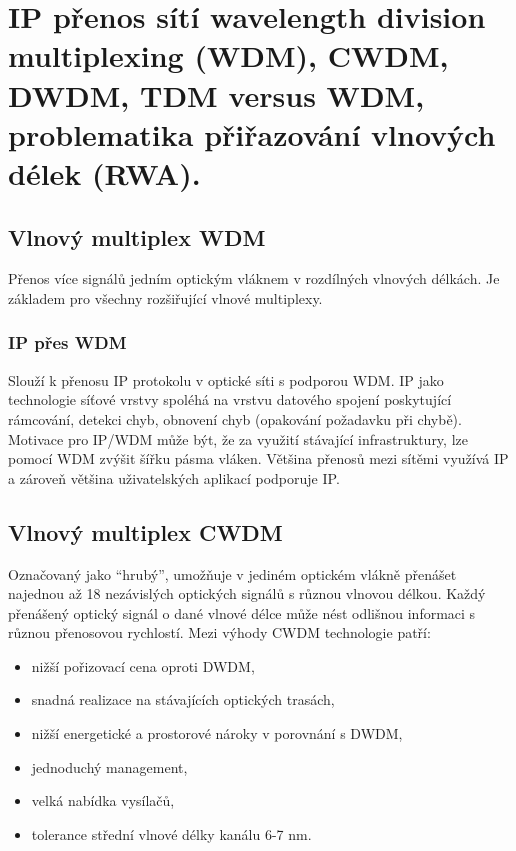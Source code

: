 \clearpage
\section{IP přenos sítí wavelength division multiplexing (WDM), CWDM, DWDM, TDM versus WDM, problematika přiřazování vlnových délek (RWA).}

\subsection{Vlnový multiplex WDM}

Přenos více signálů jedním optickým vláknem v rozdílných vlnových délkách. Je základem pro všechny rozšiřující vlnové multiplexy.

\subsubsection{IP přes WDM}

Slouží k přenosu IP protokolu v optické síti s podporou WDM. IP jako technologie síťové vrstvy spoléhá na vrstvu datového spojení poskytující rámcování, detekci chyb, obnovení chyb (opakování požadavku při chybě). Motivace pro IP/WDM může být, že za využití stávající infrastruktury, lze pomocí WDM zvýšit šířku pásma vláken. Většina přenosů mezi sítěmi využívá IP a zároveň většina uživatelských aplikací podporuje IP.

\subsection{Vlnový multiplex CWDM }
Označovaný jako \enquote{hrubý}, umožňuje v jediném optickém vlákně přenášet najednou až 18 nezávislých optických signálů s různou vlnovou délkou. Každý přenášený optický signál o dané vlnové délce může nést odlišnou informaci s různou přenosovou rychlostí.
Mezi výhody CWDM technologie patří:
\begin{itemize}
    \item nižší pořizovací cena oproti DWDM,
    \item snadná realizace na stávajících optických trasách,
    \item nižší energetické a prostorové nároky v porovnání s DWDM,
    \item jednoduchý management,
    \item velká nabídka vysílačů,
    \item tolerance střední vlnové délky kanálu 6-7 nm.
\end{itemize}

